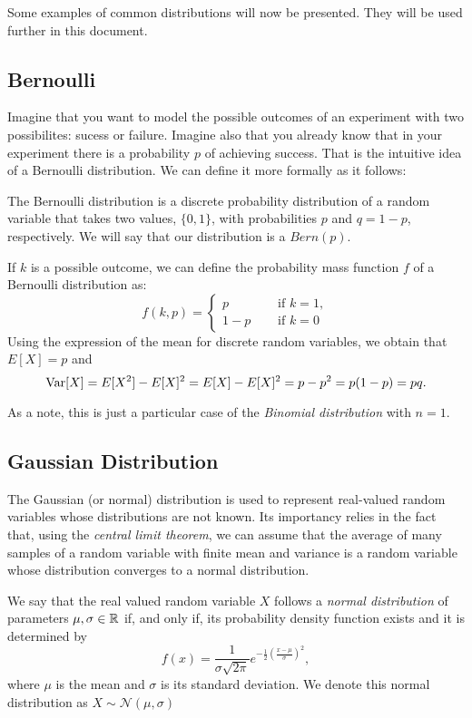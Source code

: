 Some examples of common distributions will now be presented. They will be used further in this document.

\subsection*{Bernoulli}

Imagine that you want to model the possible outcomes of an experiment with two possibilites: sucess or failure. Imagine also that you already know that in your experiment there is a probability $p$ of 
achieving success. That is the intuitive idea of a Bernoulli distribution. We can define it more formally as it follows: 

The Bernoulli distribution is a discrete probability distribution of a random variable that takes two values, $\{0,1\}$, with probabilities $p$ and $q = 1-p$, respectively. We will say that our distribution is a $Bern(p)$.

If $k$ is a possible outcome, we can define
the probability mass function $f$ of a Bernoulli distribution as:
$$
f(k,p) = 
\begin{cases} 
p \quad & \text{ if } k=1,\\
1-p \quad & \text{ if } k = 0
\end{cases}
$$
Using the expression of the mean for discrete random variables, we obtain that $E[X] = p$ and 
$$
\operatorname*{Var}[X] = E[X^2] - E[X]^2 = E[X] - E[X]^2 = p-p^2 = p(1-p) = pq.
$$

As a note, this is just a particular case of the \emph{Binomial distribution} with $n=1$.

\subsection*{Gaussian Distribution}

The Gaussian (or normal) distribution is used to represent real-valued random variables whose distributions are not known.
Its importancy relies in the fact that, using the \emph{central limit theorem}, we can assume that the average of many samples of
a random variable with finite mean and variance is a random variable whose distribution converges to a normal distribution.

\begin{ndef}
We say that the real valued random variable $X$ follows a \emph{normal distribution} of parameters $\mu,\sigma\in \mathbb{R}$ if, and only if,
its probability density function exists and it is determined by
\[
f(x) = \frac{1}{\sigma \sqrt{2\pi}}e^{-\frac{1}{2}\left( \frac{x - \mu}{\sigma}\right)^2},
\]
where $\mu$ is the mean and $\sigma$ is its standard deviation. We denote this normal distribution as $X \sim \mathcal N (\mu,\sigma)$
\end{ndef}

